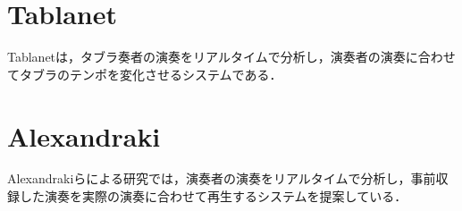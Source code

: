 \section{Tablanet}
Tablanet\cite{tablanet}は，タブラ奏者の演奏をリアルタイムで分析し，演奏者の演奏に合わせてタブラのテンポを変化させるシステムである．

\section{Alexandraki}
Alexandrakiらによる研究\cite{alexandraki:2013}\cite{alexandraki:2014}では，演奏者の演奏をリアルタイムで分析し，事前収録した演奏を実際の演奏に合わせて再生するシステムを提案している．
